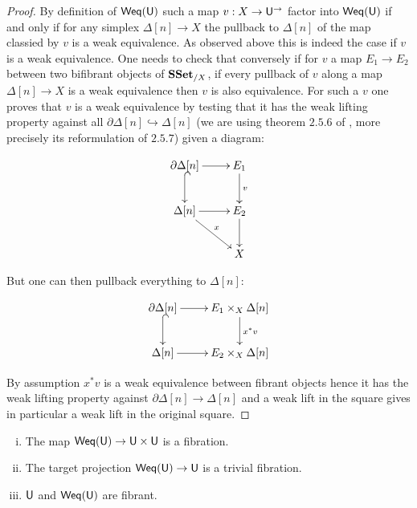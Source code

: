 \documentclass[reqno,10pt,a4paper,oneside,draft]{amsart}
\begin{document}
\begin{proof}
By definition of $\mathsf{Weq}(\mathsf{U})$ such a map $v:X \rightarrow \mathsf{U}^{\rightarrow}$ factor into $\mathsf{Weq}(\mathsf{U})$ if and only if for any simplex $\Delta[n] \rightarrow X$ the pullback to $\Delta[n]$ of the map classied by $v$ is a weak equivalence. As observed above this is indeed the case if $v$ is a weak equivalence. One needs to check that conversely if for $v$ a map $E_1 \rightarrow E_2$ between two bifibrant objects of $\mathbf{SSet}_{/X}$, if every pullback of $v$ along a map $\Delta[n] \rightarrow X$ is a weak equivalence then $v$ is also equivalence.  For such a $v$ one proves that $v$ is a weak equivalence by testing that it has the weak lifting property against all $\partial \Delta[n] \hookrightarrow \Delta[n]$ (we are using theorem $2.5.6$ of \cite{henry2018wms}, more precisely its reformulation of $2.5.7$) given a diagram:


\[ \xymatrix{\partial \Delta[n] \ar[r] \ar@{^{(}->}[d] & E_1 \ar[d]^v \\
\Delta[n] \ar[r] \ar[dr]^{x}
 & E_2 \ar[d] \\
& X
} \]

But one can then pullback everything to $\Delta[n]$:

\[ \xymatrix{\partial \Delta[n] \ar[r] \ar@{^{(}->}[d] & E_1 \times_X \Delta[n] \ar[d]^{x^*v} \\
\Delta[n] \ar[r] & E_2 \times_X \Delta[n]  \\
} \]

By assumption $x^* v$ is a weak equivalence between fibrant objects hence it has the weak lifting property against $\partial \Delta[n] \rightarrow \Delta[n]$ and a weak lift in the square gives in particular a weak lift in the original square.
\end{proof}



\begin{proposition} \label{thm:fibrancy-of-u} \hfill 
\begin{enumerate}[(i)]
\item The map $\mathsf{Weq}(\mathsf{U}) \rightarrow \mathsf{U} \times \mathsf{U}$ is a fibration.
\item The target projection $\mathsf{Weq}(\mathsf{U}) \rightarrow \mathsf{U}$ is a trivial fibration.
\item $\mathsf{U}$ and $\mathsf{Weq}(\mathsf{U})$ are fibrant.
\end{enumerate}
\end{proposition}
\end{document}
